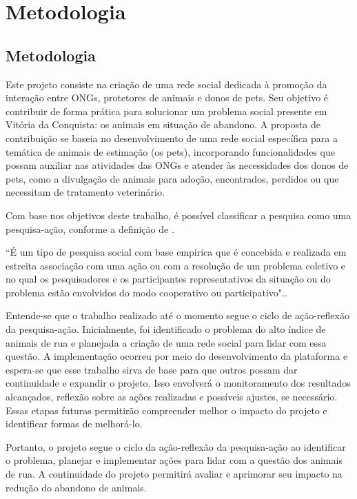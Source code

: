 \chapter{Metodologia}
\section{Metodologia}
\label{sec:Metodologia}
Este projeto consiste na criação de uma rede social dedicada à promoção da interação entre ONGs, protetores de animais e donos de pets. Seu objetivo é contribuir de forma prática para solucionar um problema social presente em Vitória da Conquista: os animais em situação de abandono. A proposta de contribuição se baseia no desenvolvimento de uma rede social específica para a temática de animais de estimação (os pets), incorporando funcionalidades que possam auxiliar nas atividades das ONGs e atender às necessidades dos donos de pets, como a divulgação de animais para adoção, encontrados, perdidos ou que necessitam de tratamento veterinário.

Com base nos objetivos deste trabalho, é possível classificar a pesquisa como uma pesquisa-ação, conforme a definição de \cite{Thiollent}.
\begin{citacao}
“É um tipo de pesquisa social com base empírica que é concebida e realizada em estreita associação com uma ação ou com a resolução de um problema coletivo e no qual os pesquisadores e os participantes representativos da situação ou do problema estão envolvidos do modo cooperativo ou participativo".\cite[p. 14]{Thiollent}.
\end{citacao}
Entende-se que o trabalho realizado até o momento segue o ciclo de ação-reflexão da pesquisa-ação. Inicialmente, foi identificado o problema do alto índice de animais de rua e planejada a criação de uma rede social para lidar com essa questão. A implementação ocorreu por meio do desenvolvimento da plataforma e espera-se que esse trabalho sirva de base para que outros possam dar continuidade e expandir o projeto. Isso envolverá o monitoramento dos resultados alcançados, reflexão sobre as ações realizadas e possíveis ajustes, se necessário. Essas etapas futuras permitirão compreender melhor o impacto do projeto e identificar formas de melhorá-lo.

Portanto, o projeto segue o ciclo da ação-reflexão da pesquisa-ação ao identificar o problema, planejar e implementar ações para lidar com a questão dos animais de rua. A continuidade do projeto permitirá avaliar e aprimorar seu impacto na redução do abandono de animais.



